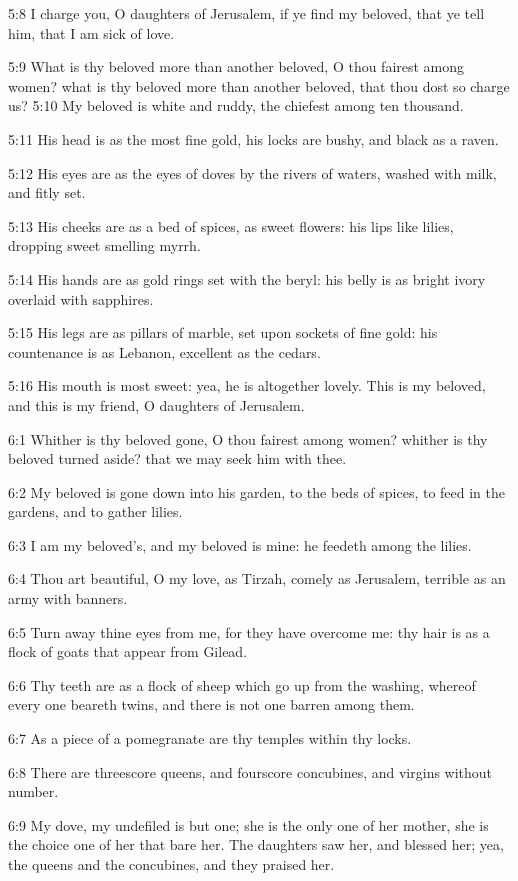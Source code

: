 5:8 I charge you, O daughters of Jerusalem, if ye find my beloved, that ye tell him, that I am sick of love.

5:9 What is thy beloved more than another beloved, O thou fairest among women? what is thy beloved more than another beloved, that thou dost so charge us?  5:10 My beloved is white and ruddy, the chiefest among ten thousand.

5:11 His head is as the most fine gold, his locks are bushy, and black as a raven.

5:12 His eyes are as the eyes of doves by the rivers of waters, washed with milk, and fitly set.

5:13 His cheeks are as a bed of spices, as sweet flowers: his lips like lilies, dropping sweet smelling myrrh.

5:14 His hands are as gold rings set with the beryl: his belly is as bright ivory overlaid with sapphires.

5:15 His legs are as pillars of marble, set upon sockets of fine gold: his countenance is as Lebanon, excellent as the cedars.

5:16 His mouth is most sweet: yea, he is altogether lovely. This is my beloved, and this is my friend, O daughters of Jerusalem.

6:1 Whither is thy beloved gone, O thou fairest among women? whither is thy beloved turned aside? that we may seek him with thee.

6:2 My beloved is gone down into his garden, to the beds of spices, to feed in the gardens, and to gather lilies.

6:3 I am my beloved's, and my beloved is mine: he feedeth among the lilies.

6:4 Thou art beautiful, O my love, as Tirzah, comely as Jerusalem, terrible as an army with banners.

6:5 Turn away thine eyes from me, for they have overcome me: thy hair is as a flock of goats that appear from Gilead.

6:6 Thy teeth are as a flock of sheep which go up from the washing, whereof every one beareth twins, and there is not one barren among them.

6:7 As a piece of a pomegranate are thy temples within thy locks.

6:8 There are threescore queens, and fourscore concubines, and virgins without number.

6:9 My dove, my undefiled is but one; she is the only one of her mother, she is the choice one of her that bare her. The daughters saw her, and blessed her; yea, the queens and the concubines, and they praised her.

